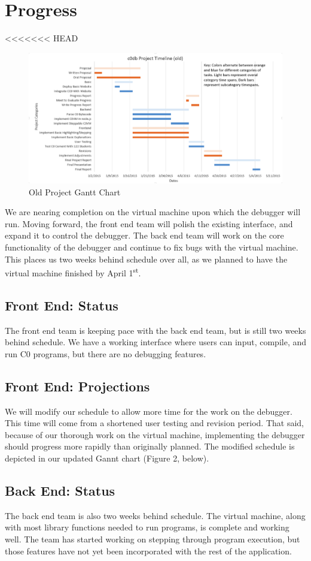 \documentclass[11pt]{article}
\begin{document}
\section{Progress}
<<<<<<< HEAD
\begin{figure}[h]
  \centering
  \includegraphics[width=\linewidth]{old-gantt.png}
  \caption{Old Project Gantt Chart}
  \label{fig:old-gantt}
\end{figure}
We are nearing completion on the virtual machine upon which the debugger will
run. Moving forward, the front end team will polish the existing interface, and
expand it to control the debugger. The back end team will work on the core
functionality of the debugger and continue to fix bugs with the virtual machine.
This places us two weeks behind schedule over all, as we planned to have the
virtual machine finished by April 1\textsuperscript{st}.
\subsection{Front End: Status}
The front end team is keeping pace with the back end team, but is still two
weeks behind schedule. We have a working interface where users can input,
compile, and run C0 programs, but there are no debugging features.
\subsection{Front End: Projections}
We will modify our schedule to allow more time for the work on the debugger.
This time will come from a shortened user testing and revision period. That
said, because of our thorough work on the virtual machine, implementing the
debugger should progress more rapidly than originally planned. The modified
schedule is depicted in our updated Gannt chart (Figure 2, below).
\subsection{Back End: Status}
The back end team is also two weeks behind schedule. The virtual machine, along
with most library functions needed to run programs, is complete and working
well. The team has started working on stepping through program execution, but
those features have not yet been incorporated with the rest of the application.
\end{document}
